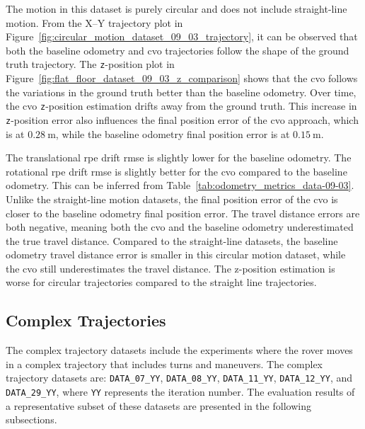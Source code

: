 \documentclass[report.tex]{subfiles}
\begin{document}


    The motion in this dataset is purely circular and does not include straight-line motion. From the X--Y trajectory plot in Figure~\ref{fig:circular_motion_dataset_09_03_trajectory}, it can be observed that both the baseline odometry and \gls{cvo} trajectories follow the shape of the ground truth trajectory. The \texttt{z}-position plot in Figure~\ref{fig:flat_floor_dataset_09_03_z_comparison} shows that the \gls{cvo} follows the variations in the ground truth better than the baseline odometry. Over time, the \gls{cvo} \texttt{z}-position estimation drifts away from the ground truth. This increase in \texttt{z}-position error also influences the final position error of the \gls{cvo} approach, which is at $0.28~\mathrm{m}$, while the baseline odometry final position error is at $0.15~\mathrm{m}$. 
    
    The translational \gls{rpe} drift \gls{rmse} is slightly lower for the baseline odometry. The rotational \gls{rpe} drift \gls{rmse} is slightly better for the \gls{cvo} compared to the baseline odometry. This can be inferred from Table~\ref{tab:odometry_metrics_data-09-03}. Unlike the straight-line motion datasets, the final position error of the \gls{cvo} is closer to the baseline odometry final position error. The travel distance errors are both negative, meaning both the \gls{cvo} and the baseline odometry underestimated the true travel distance. Compared to the straight-line datasets, the baseline odometry travel distance error is smaller in this circular motion dataset, while the \gls{cvo} still underestimates the travel distance. The z-position estimation is worse for circular trajectories compared to the straight line trajectories.
    \FloatBarrier

    \subsection{Complex Trajectories}    

    The complex trajectory datasets include the experiments where the rover moves in a complex trajectory that includes turns and maneuvers. The complex trajectory datasets are: \texttt{DATA\_07\_YY}, \texttt{DATA\_08\_YY}, \texttt{DATA\_11\_YY}, \texttt{DATA\_12\_YY}, and \texttt{DATA\_29\_YY}, where \texttt{YY} represents the iteration number. The evaluation results of a representative subset of these datasets are presented in the following subsections.
    
\end{document}
